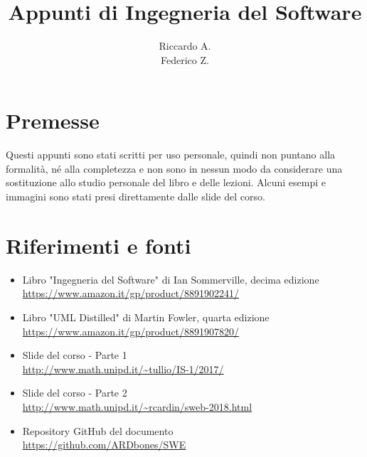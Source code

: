

\author{Riccardo A. \\ Federico Z.}
\title{Appunti di Ingegneria del Software}



\maketitle

\section*{Premesse}
Questi appunti sono stati scritti per uso personale, quindi non puntano alla formalità, né alla completezza e non sono in nessun modo da considerare una sostituzione allo studio personale del libro e delle lezioni. 
Alcuni esempi e immagini sono stati presi direttamente dalle slide del corso.

\section*{Riferimenti e fonti}
\begin{itemize}
\item Libro "Ingegneria del Software" di Ian Sommerville, decima edizione\\
\url{https://www.amazon.it/gp/product/8891902241/}
\item Libro "UML Distilled" di Martin Fowler, quarta edizione\\
\url{https://www.amazon.it/gp/product/8891907820/}
\item Slide del corso - Parte 1 \\
\url{http://www.math.unipd.it/~tullio/IS-1/2017/}
\item Slide del corso - Parte 2 \\
\url{http://www.math.unipd.it/~rcardin/sweb-2018.html}
\item Repository GitHub del documento \\
\url{https://github.com/ARDbones/SWE}
\end{itemize}

\tableofcontents
\newpage



